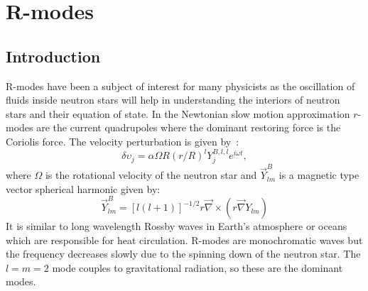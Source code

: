 \documentclass{ttuthes2007}
\begin{document}
\chapter{\textbf{R-modes}}

\section{Introduction}
R-modes
have been a subject of interest for many physicists as the oscillation of fluids
inside neutron stars will help in understanding the interiors of neutron
stars and their equation of state. In the Newtonian slow motion approximation $r$-modes
are the current quadrupoles
where the dominant restoring force is the Coriolis force. 
The velocity perturbation is given by~\cite{Owen:1998xg}:
\begin{equation}
\delta{\upsilon_j}=\alpha\Omega R(r/R)^ l Y_j^{B,l,l}e^{i \omega t},
\end{equation}
where $\Omega$ is the rotational velocity of the neutron star and $\vec{Y}_{lm}^B$ is a magnetic type vector spherical harmonic given by:
\begin{equation}
\vec{Y}_{lm}^B=[l(l+1)]^{-1/2} r \vec{\nabla} \times (r \vec{\nabla}Y_{lm})
\end{equation}
It is similar to long
wavelength Rossby waves in Earth's atmosphere or oceans which are responsible for
heat circulation. R-modes are monochromatic waves but the frequency decreases
slowly due to the spinning down of the neutron star. The $l=m=2$
mode couples to gravitational radiation, so these are the dominant modes.
\end{document}
